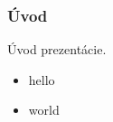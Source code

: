 \begin{frame}
	\frametitle{Úvod}
	
	Úvod prezentácie.
	
	\begin{itemize}
		\item hello
		\item world
	\end{itemize}
	
\end{frame}